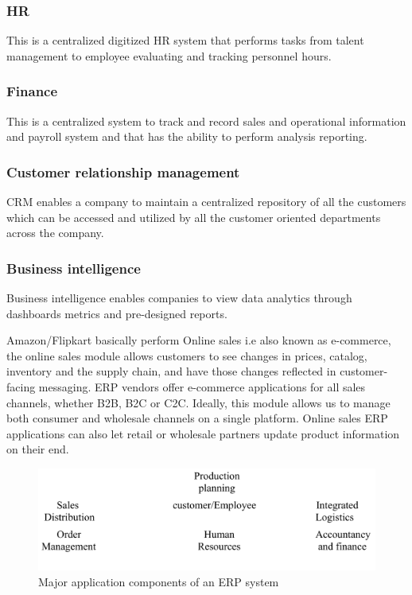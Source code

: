 \documentclass[twocolumn, 12pt, a4paper]{article}
\begin{document}
\subsubsection{HR}
This is a centralized digitized HR system that performs tasks from talent management to employee evaluating and tracking personnel hours.

\subsubsection{Finance}
This is a centralized system to track and record sales and operational information and payroll system and that has the ability to perform analysis reporting.

\subsubsection{Customer relationship management}
CRM enables a company to maintain a centralized repository of all the customers which can be accessed and utilized by all the customer oriented departments across the company.

\subsubsection{Business intelligence}
Business intelligence enables companies to view data analytics through dashboards metrics and pre-designed reports.

Amazon/Flipkart basically perform Online sales i.e  also known as e-commerce, the online sales module allows customers to see changes in prices, catalog, inventory and the supply chain, and have those changes reflected in customer-facing messaging. ERP vendors offer e-commerce applications for all sales channels, whether B2B, B2C or C2C. Ideally, this module allows us to manage both consumer and wholesale channels on a single platform. Online sales ERP applications can also let retail or wholesale partners update product information on their end.

\vskip10pt
\begin{figure}[h]
  \includegraphics[width=\columnwidth]{majcomERP}
  \caption{Major application components of an ERP system}
\end{figure}
\end{document}
